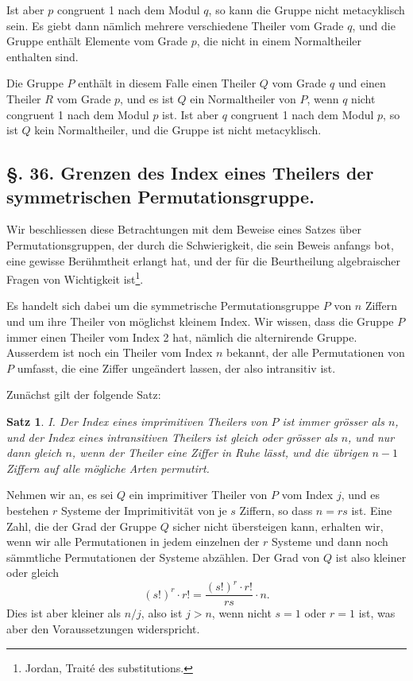 \documentclass[12pt,a4paper]{article}
\theoremstyle{plain}
\newtheorem{satz}{Satz}[section]
\theoremstyle{definition}
\theoremstyle{remark}
\begin{document}
Ist aber $p$ congruent 1 nach dem Modul $q$, so kann die Gruppe nicht metacyklisch sein. Es giebt dann nämlich mehrere verschiedene Theiler vom Grade $q$, und die Gruppe enthält Elemente vom Grade $p$, die nicht in einem Normaltheiler enthalten sind.

Die Gruppe $P$ enthält in diesem Falle einen Theiler $Q$ vom Grade $q$ und einen Theiler $R$ vom Grade $p$, und es ist $Q$ ein Normaltheiler von $P$, wenn $q$ nicht congruent 1 nach dem Modul $p$ ist. Ist aber $q$ congruent 1 nach dem Modul $p$, so ist $Q$ kein Normaltheiler, und die Gruppe ist nicht metacyklisch.


\subsection*{\S. 36. Grenzen des Index eines Theilers der symmetrischen Permutationsgruppe.}

Wir beschliessen diese Betrachtungen mit dem Beweise eines Satzes über Permutationsgruppen, der durch die Schwierigkeit, die sein Beweis anfangs bot, eine gewisse Berühmtheit erlangt hat, und der für die Beurtheilung algebraischer Fragen von Wichtigkeit ist\footnote{Jordan, Traité des substitutions.}.

Es handelt sich dabei um die symmetrische Permutationsgruppe $P$ von $n$ Ziffern und um ihre Theiler von möglichst kleinem Index. Wir wissen, dass die Gruppe $P$ immer einen Theiler vom Index 2 hat, nämlich die alternirende Gruppe. Ausserdem ist noch ein Theiler vom Index $n$ bekannt, der alle Permutationen von $P$ umfasst, die eine Ziffer ungeändert lassen, der also intransitiv ist.

Zunächst gilt der folgende Satz:

\begin{satz}
I. Der Index eines imprimitiven Theilers von $P$ ist immer grösser als $n$, und der Index eines intransitiven Theilers ist gleich oder grösser als $n$, und nur dann gleich $n$, wenn der Theiler eine Ziffer in Ruhe lässt, und die übrigen $n-1$ Ziffern auf alle mögliche Arten permutirt.
\end{satz}

Nehmen wir an, es sei $Q$ ein imprimitiver Theiler von $P$ vom Index $j$, und es bestehen $r$ Systeme der Imprimitivität von je $s$ Ziffern, so dass $n = rs$ ist. Eine Zahl, die der Grad der Gruppe $Q$ sicher nicht übersteigen kann, erhalten wir, wenn wir alle Permutationen in jedem einzelnen der $r$ Systeme und dann noch sämmtliche Permutationen der Systeme abzählen. Der Grad von $Q$ ist also kleiner oder gleich
\[
(s!)^{r} \cdot r! = \frac{(s!)^{r} \cdot r!}{rs} \cdot n.
\]
Dies ist aber kleiner als $n/j$, also ist $j > n$, wenn nicht $s = 1$ oder $r = 1$ ist, was aber den Voraussetzungen widerspricht.
\end{document}
